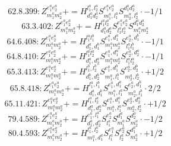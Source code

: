 \documentclass[letterpaper,10pt,fleqn,leqno,onecolumn]{article}
\begin{document}
\begin{equation} \;\;\;\;\;\;  62.8.399: Z^{e_{1}^{a}e_{2}^{a}}_{m_{1}^{a}m_{2}^{a}}+=H^{l_{1}^{a},l_{2}^{a}}_{d_{1}^{a}d_{2}^{a}}S^{e_{1}^{a}e_{2}^{a}}_{m_{1}^{a},l_{1}^{a}}S^{d_{1}^{a}d_{2}^{a}}_{m_{2}^{a},l_{2}^{a}}\cdot -1/1 \end{equation}
\begin{equation} \;\;\;\;\;\;  63.3.402: Z^{e_{1}^{a}e_{2}^{a}}_{m_{1}^{a}m_{2}^{a}}+=H^{l_{1}^{a}l_{2}^{a}}_{d_{1}^{a}d_{2}^{a}}S^{e_{1}^{a}e_{2}^{a}}_{l_{1}^{a}l_{2}^{a}}S^{d_{1}^{a}d_{2}^{a}}_{m_{1}^{a}m_{2}^{a}} \end{equation}
\begin{equation} \;\;\;\;\;\;  64.6.408: Z^{e_{1}^{a}e_{2}^{a}}_{m_{1}^{a}m_{2}^{a}}+=H^{l_{1}^{a}l_{1}^{b}}_{d_{1}^{a},d_{1}^{b}}S^{e_{1}^{a},d_{1}^{a}}_{m_{1}^{a}m_{2}^{a}}S^{e_{2}^{a},d_{1}^{b}}_{l_{1}^{a}l_{1}^{b}}\cdot -1/1 \end{equation}
\begin{equation} \;\;\;\;\;\;  64.8.410: Z^{e_{1}^{a}e_{2}^{a}}_{m_{1}^{a}m_{2}^{a}}+=H^{l_{1}^{a}l_{2}^{a}}_{d_{1}^{a},d_{2}^{a}}S^{e_{1}^{a},d_{1}^{a}}_{m_{1}^{a}m_{2}^{a}}S^{e_{2}^{a},d_{2}^{a}}_{l_{1}^{a}l_{2}^{a}}\cdot -1/1 \end{equation}
\begin{equation} \;\;\;\;\;\;  65.3.413: Z^{e_{1}^{a}e_{2}^{a}}_{m_{1}^{a}m_{2}^{a}}+=H^{l_{1}^{b},l_{2}^{b}}_{d_{1}^{b},d_{2}^{b}}S^{e_{1}^{a},d_{1}^{b}}_{m_{1}^{a},l_{1}^{b}}S^{e_{2}^{a},d_{2}^{b}}_{m_{2}^{a},l_{2}^{b}}\cdot +1/2 \end{equation}
\begin{equation} \;\;\;\;\;\;  65.8.418: Z^{e_{1}^{a}e_{2}^{a}}_{m_{1}^{a}m_{2}^{a}}+=H^{l_{1}^{a},l_{1}^{b}}_{d_{1}^{a},d_{1}^{b}}S^{e_{1}^{a},d_{1}^{a}}_{m_{1}^{a},l_{1}^{a}}S^{e_{2}^{a},d_{1}^{b}}_{m_{2}^{a},l_{1}^{b}}\cdot 2/2 \end{equation}
\begin{equation} \;\;\;\;\;\;  65.11.421: Z^{e_{1}^{a}e_{2}^{a}}_{m_{1}^{a}m_{2}^{a}}+=H^{l_{1}^{a},l_{2}^{a}}_{d_{1}^{a},d_{2}^{a}}S^{e_{1}^{a},d_{1}^{a}}_{m_{1}^{a},l_{1}^{a}}S^{e_{2}^{a},d_{2}^{a}}_{m_{2}^{a},l_{2}^{a}}\cdot +1/2 \end{equation}
\begin{equation} \;\;\;\;\;\;  79.4.589: Z^{e_{1}^{a}e_{2}^{a}}_{m_{1}^{a}m_{2}^{a}}+=H^{e_{1}^{a},l_{1}^{a}}_{d_{1}^{a},d_{2}^{a}}S^{e_{2}^{a}}_{l_{1}^{a}}S^{d_{1}^{a}}_{m_{1}^{a}}S^{d_{2}^{a}}_{m_{2}^{a}}\cdot -1/2 \end{equation}
\begin{equation} \;\;\;\;\;\;  80.4.593: Z^{e_{1}^{a}e_{2}^{a}}_{m_{1}^{a}m_{2}^{a}}+=H^{l_{1}^{a},l_{2}^{a}}_{m_{1}^{a},d_{1}^{a}}S^{e_{1}^{a}}_{l_{1}^{a}}S^{e_{2}^{a}}_{l_{2}^{a}}S^{d_{1}^{a}}_{m_{2}^{a}}\cdot +1/2 \end{equation}
\end{document}
